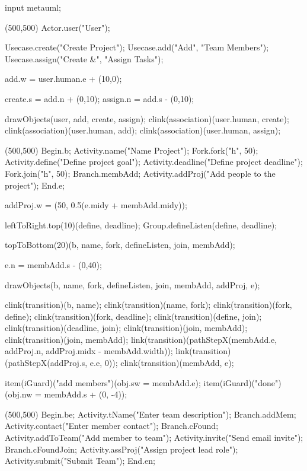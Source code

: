 \begin{empfile}
\begin{empcmds}
input metauml;
\end{empcmds}

\begin{empdef}[usecasediag](500,500)
  Actor.user("User");

  Usecase.create("Create Project");
  Usecase.add("Add", "Team Members");
  Usecase.assign("Create &", "Assign Tasks");

  add.w = user.human.e + (10,0);

  create.s = add.n + (0,10);
  assign.n = add.s - (0,10);
  
  
  drawObjects(user, add, create, assign);
  clink(association)(user.human, create);
  clink(association)(user.human, add);
  clink(association)(user.human, assign);
\end{empdef}

\begin{empdef}[activityR1](500,500)
Begin.b;
Activity.name("Name Project");
Fork.fork("h", 50);
Activity.define("Define project goal");
Activity.deadline("Define project deadline");
Fork.join("h", 50);
Branch.membAdd;
Activity.addProj("Add people to the project");
End.e;

addProj.w = (50, 0.5(e.midy + membAdd.midy));


leftToRight.top(10)(define, deadline);
Group.defineListen(define, deadline);

topToBottom(20)(b, name, fork, defineListen, join, membAdd);

e.n = membAdd.s - (0,40);

drawObjects(b, name, fork, defineListen, join, membAdd, addProj, e);

clink(transition)(b, name);
clink(transition)(name, fork);
clink(transition)(fork, define);
clink(transition)(fork, deadline);
clink(transition)(define, join);
clink(transition)(deadline, join);
clink(transition)(join, membAdd);
clink(transition)(join, membAdd);
link(transition)(pathStepX(membAdd.e, addProj.n,  addProj.midx - membAdd.width));
link(transition)(pathStepX(addProj.s, e.e, 0));
clink(transition)(membAdd, e);

item(iGuard)("add members")(obj.sw = membAdd.e);
item(iGuard)("done")(obj.nw = membAdd.s + (0, -4));
\end{empdef}

\begin{empdef}[activityR2](500,500)
Begin.be;
Activity.tName("Enter team description");
Branch.addMem;
Activity.contact("Enter member contact");
Branch.cFound;
Activity.addToTeam("Add member to team");
Activity.invite("Send email invite");
Branch.cFoundJoin;
Activity.assProj("Assign project lead role");
Activity.submit("Submit Team");
End.en;


\end{empdef}
\end{empfile}
